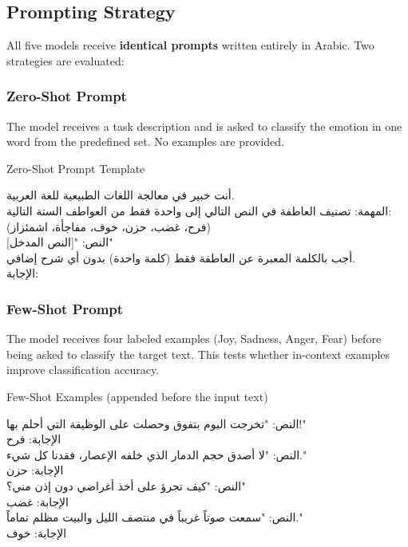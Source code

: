 \subsection{Prompting Strategy}

All five models receive \textbf{identical prompts} written entirely in Arabic. Two strategies are evaluated:

\subsubsection{Zero-Shot Prompt}
The model receives a task description and is asked to classify the emotion in one word from the predefined set. No examples are provided.

\begin{reportblock}{Zero-Shot Prompt Template}
\begin{flushleft}
\small
\textarabic{أنت خبير في معالجة اللغات الطبيعية للغة العربية.}\\[2pt]
\textarabic{المهمة: تصنيف العاطفة في النص التالي إلى واحدة فقط من العواطف الستة التالية:}\\[2pt]
\textarabic{(فرح، غضب، حزن، خوف، مفاجأة، اشمئزاز)}\\[6pt]
\textarabic{النص: "[النص المدخل]"}\\[6pt]
\textarabic{أجب بالكلمة المعبرة عن العاطفة فقط (كلمة واحدة) بدون أي شرح إضافي.}\\[2pt]
\textarabic{الإجابة:}
\end{flushleft}
\end{reportblock}

\subsubsection{Few-Shot Prompt}
The model receives four labeled examples (Joy, Sadness, Anger, Fear) before being asked to classify the target text. This tests whether in-context examples improve classification accuracy.

\begin{reportblock}{Few-Shot Examples (appended before the input text)}
\begin{flushleft}
\small
\textarabic{النص: "تخرجت اليوم بتفوق وحصلت على الوظيفة التي أحلم بها!"}\\
\textarabic{الإجابة: فرح}\\[4pt]
\textarabic{النص: "لا أصدق حجم الدمار الذي خلفه الإعصار، فقدنا كل شيء."}\\
\textarabic{الإجابة: حزن}\\[4pt]
\textarabic{النص: "كيف تجرؤ على أخذ أغراضي دون إذن مني؟"}\\
\textarabic{الإجابة: غضب}\\[4pt]
\textarabic{النص: "سمعت صوتاً غريباً في منتصف الليل والبيت مظلم تماماً."}\\
\textarabic{الإجابة: خوف}
\end{flushleft}
\end{reportblock}

